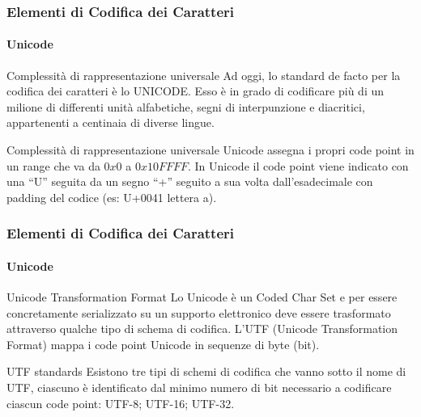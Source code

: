 \begin{frame}
	\frametitle{Elementi di Codifica dei Caratteri}
	\framesubtitle{Unicode}
	\addtocounter{nframe}{1}

	\begin{block}{Complessità di rappresentazione universale}
		Ad oggi, lo standard de facto per la codifica dei caratteri è lo UNICODE. Esso è in grado di codificare più di un milione di differenti unità alfabetiche, segni di interpunzione e diacritici, appartenenti a centinaia di diverse lingue.
	\end{block}

	\begin{block}{Complessità di rappresentazione universale}
		Unicode assegna i propri code point in un range che va da $0x0$ a $0x10FFFF$. In Unicode il code point viene  indicato con una ``U'' seguita da un segno ``+'' seguito a sua volta dall'esadecimale con padding del codice (es: U+0041 lettera a).
	\end{block}

\end{frame}

\begin{frame}
	\frametitle{Elementi di Codifica dei Caratteri}
	\framesubtitle{Unicode}
	\addtocounter{nframe}{1}

	\begin{block}{Unicode Transformation Format}
		Lo Unicode è un Coded Char Set e per essere concretamente serializzato su un supporto elettronico deve essere trasformato attraverso qualche tipo di schema di codifica.
		L'UTF (Unicode Transformation Format) mappa i code point Unicode in sequenze di byte (bit).
	\end{block}

	\begin{block}{UTF standards}
		Esistono tre tipi di schemi di codifica che vanno sotto il nome di UTF, ciascuno è identificato dal minimo numero di bit necessario a codificare ciascun code point: UTF-8; UTF-16; UTF-32. 
	\end{block}

\end{frame}

